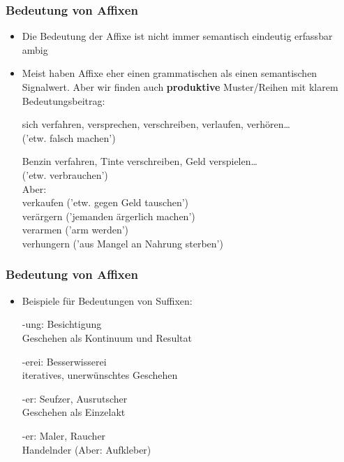 
\begin{frame}
\frametitle{Bedeutung von Affixen}

\begin{itemize}
	\item Die Bedeutung der Affixe ist nicht immer semantisch eindeutig erfassbar \ras ambig
	\item Meist haben Affixe eher einen grammatischen als einen semantischen Signalwert. Aber wir finden auch \textbf{produktive} Muster/Reihen mit klarem Bedeutungsbeitrag:
	
	\ea sich verfahren, versprechen, verschreiben, verlaufen, verhören…\\
	\ras('etw. falsch machen')
	\z
	
	\ea Benzin verfahren, Tinte verschreiben, Geld verspielen\dots \\
\ras ('etw. verbrauchen')\\
Aber:\\
verkaufen ('etw. gegen Geld tauschen')\\
verärgern ('jemanden ärgerlich machen')\\
verarmen ('arm werden')\\
verhungern ('aus Mangel an Nahrung sterben')
	\z

\end{itemize}


\end{frame}




\begin{frame}
\frametitle{Bedeutung von Affixen}

\begin{itemize}
	\item Beispiele für Bedeutungen von Suffixen:

\vspace{1em}

	\ea -ung: Besichtigung\\
	\ras Geschehen als Kontinuum und Resultat
	\z
	
	\ea -erei: Besserwisserei\\
\ras iteratives, unerwünschtes Geschehen
	\z

	\ea -er: Seufzer, Ausrutscher\\
\ras Geschehen als Einzelakt
	\z

	\ea -er: Maler, Raucher\\ 
	\ras Handelnder (Aber: Aufkleber)
	\z

\end{itemize}


\end{frame}



